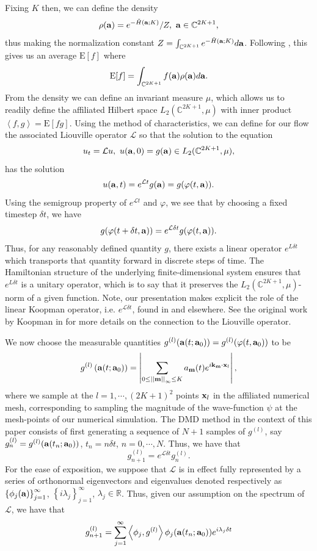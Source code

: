 \documentclass[aps,prl,preprint,groupedaddress]{revtex4-1}
\newcommand{\gnorm}[1]{\left|\left| #1\right|\right|}
\begin{document}
Fixing $K$ then, we can define the density 
\[
\rho({\bf a}) = e^{-\tilde{H}({\bf a};K)}/Z, ~ {\bf a} \in \mathbb{C}^{2K+1},
\]
thus making the normalization constant $Z = \int_{\mathbb{C}^{2K+1}} e^{-\tilde{H}({\bf a};K)} d{\bf a}$.  Following \cite{chorin}, this gives us an average $\mbox{E}[f]$ where 
\[
\mbox{E}[f] = \int_{\mathbb{C}^{2K+1}} f({\bf a})\rho({\bf a})d{\bf a}.
\]
From the density we can define an invariant measure $\mu$, which allows us to readily define the affiliated Hilbert space $L_{2}(\mathbb{C}^{2K+1},\mu)$ with inner product $\left<f,g\right> = \mbox{E}[fg]$. Using the method of characteristics, we can define for our flow the associated Liouville operator $\mathcal{L}$ so that the solution to the equation
\[
u_{t} = \mathcal{L}u, ~ u({\bf a},0) = g({\bf a}) \in L_{2}(\mathbb{C}^{2K+1},\mu),
\]
has the solution 
\[
u({\bf a},t) = e^{\mathcal{L}t}g({\bf a}) = g(\varphi(t,{\bf a})).  
\]
Using the semigroup property of $e^{\mathcal{L}t}$ and $\varphi$, we see that by choosing a fixed timestep $\delta t$, we have 
\[
g(\varphi(t+\delta t,{\bf a}))= e^{\mathcal{L}\delta t} g(\varphi(t,{\bf a})).
\]
Thus, for any reasonably defined quantity $g$, there exists a linear operator $e^{L\delta t}$ which transports that quantity forward in discrete steps of time.  The Hamiltonian structure of the underlying finite-dimensional system ensures that $e^{L\delta t}$ is a unitary operator, which is to say that it preserves the $L_{2}(\mathbb{C}^{2K+1},\mu)$-norm of a given function.  Note, our presentation makes explicit the role of the linear Koopman operator, i.e. $e^{\mathcal{L}\delta t}$, found in \cite{kutz} and elsewhere.  See the original work by Koopman in \cite{koopman} for more details on the connection to the Liouville operator.  

We now choose the measurable quantities $g^{(l)}({\bf a}(t;{\bf a}_{0}))=g^{(l)}(\varphi(t,{\bf a}_{0}))$ to be 
\[
g^{(l)}\left({\bf a}(t;{\bf a}_{0})\right) = \left|\sum_{0\leq\gnorm{{\bf m}}_{\infty}\leq K}a_{{\bf m}}(t)e^{i{\bf k}_{{\bf m}}\cdot {\bf x}_{l}} \right|,
\]
where we sample at the $l=1, \cdots, (2K+1)^{2}$ points ${\bf x}_{l}$ in the affiliated numerical mesh, corresponding to sampling the magnitude of the wave-function $\psi$ at the mesh-points of our numerical simulation.  The DMD method in the context of this paper consists of first generating a sequence of $N+1$ samples of $g^{(l)}$, say $g^{(l)}_{n} = g^{(l)}({\bf a}(t_{n};{\bf a}_{0}))$, $t_{n}=n\delta t $, $n=0,\cdots,N$.   Thus, we have that 
\[
g^{(l)}_{n+1} = e^{\mathcal{L}\delta t} g^{(l)}_{n}.  
\] 
For the ease of exposition, we suppose that $\mathcal{L}$ is in effect fully represented by a series of orthonormal eigenvectors and eigenvalues denoted respectively as $\left\{\phi_{j}({\bf a})\right\}_{j=1}^{\infty}$, $\left\{i\lambda_{j}\right\}_{j=1}^{\infty}$, $\lambda_{j}\in\mathbb{R}$.  Thus, given our assumption on the spectrum of $\mathcal{L}$, we have that 
\[
g^{(l)}_{n+1} = \sum_{j=1}^{\infty}\left<\phi_{j},g^{(l)}\right>\phi_{j}({\bf a}(t_{n};{\bf a}_{0}))e^{i\lambda_{j}\delta t}
\]
\end{document}
